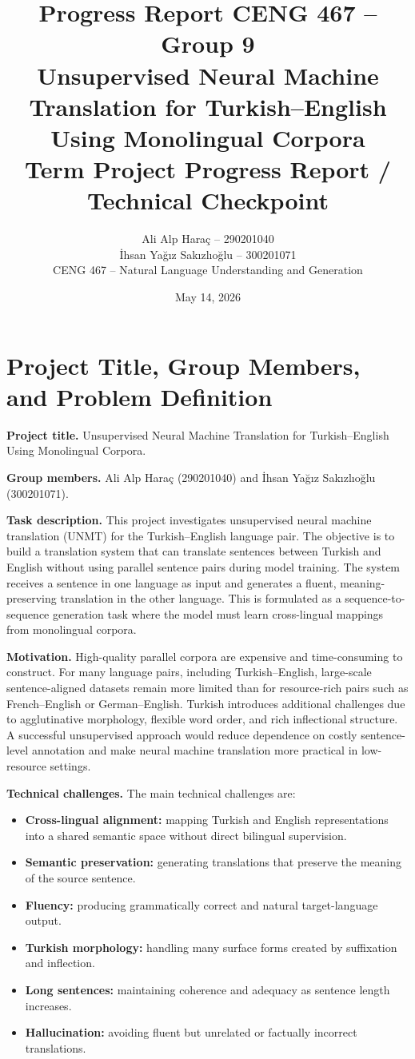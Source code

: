 \documentclass[11pt]{article}
\title{\textbf{Progress Report CENG 467 -- Group 9}\\
\large Unsupervised Neural Machine Translation for Turkish--English Using Monolingual Corpora\\
\large Term Project Progress Report / Technical Checkpoint}
\author{Ali Alp Haraç -- 290201040\\
İhsan Yağız Sakızlıoğlu -- 300201071\\
CENG 467 -- Natural Language Understanding and Generation}
\date{May 14, 2026}
\begin{document}
\maketitle

\section{Project Title, Group Members, and Problem Definition}

\textbf{Project title.} Unsupervised Neural Machine Translation for Turkish--English Using Monolingual Corpora.

\textbf{Group members.} Ali Alp Haraç (290201040) and İhsan Yağız Sakızlıoğlu (300201071).

\textbf{Task description.} This project investigates unsupervised neural machine translation (UNMT) for the Turkish--English language pair. The objective is to build a translation system that can translate sentences between Turkish and English without using parallel sentence pairs during model training. The system receives a sentence in one language as input and generates a fluent, meaning-preserving translation in the other language. This is formulated as a sequence-to-sequence generation task where the model must learn cross-lingual mappings from monolingual corpora.

\textbf{Motivation.} High-quality parallel corpora are expensive and time-consuming to construct. For many language pairs, including Turkish--English, large-scale sentence-aligned datasets remain more limited than for resource-rich pairs such as French--English or German--English. Turkish introduces additional challenges due to agglutinative morphology, flexible word order, and rich inflectional structure. A successful unsupervised approach would reduce dependence on costly sentence-level annotation and make neural machine translation more practical in low-resource settings.

\textbf{Technical challenges.} The main technical challenges are:
\begin{itemize}
    \item \textbf{Cross-lingual alignment:} mapping Turkish and English representations into a shared semantic space without direct bilingual supervision.
    \item \textbf{Semantic preservation:} generating translations that preserve the meaning of the source sentence.
    \item \textbf{Fluency:} producing grammatically correct and natural target-language output.
    \item \textbf{Turkish morphology:} handling many surface forms created by suffixation and inflection.
    \item \textbf{Long sentences:} maintaining coherence and adequacy as sentence length increases.
    \item \textbf{Hallucination:} avoiding fluent but unrelated or factually incorrect translations.
\end{itemize}
\end{document}
